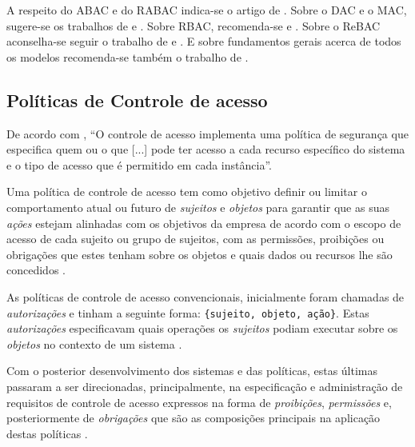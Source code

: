 A respeito do ABAC e do RABAC indica-se o artigo de . Sobre o DAC e o MAC, sugere-se os trabalhos de  e . Sobre RBAC, recomenda-se  e . Sobre o ReBAC aconselha-se seguir o trabalho de  e . E sobre fundamentos gerais acerca de todos os modelos recomenda-se também o trabalho de .

\subsection{Políticas de Controle de acesso}\label{controle_acesso}
De acordo com , ``O controle de acesso implementa uma política de segurança que especifica quem ou o que [...] pode ter acesso a cada recurso específico do sistema e o tipo de acesso que é permitido em cada instância''.

Uma política de controle de acesso tem como objetivo definir ou limitar o comportamento atual ou futuro de \textit{sujeitos} e \textit{objetos} para garantir que as suas \textit{ações} estejam alinhadas com os objetivos da empresa de acordo com o escopo de acesso de cada sujeito ou grupo de sujeitos, com as permissões, proibições ou obrigações que estes tenham sobre os objetos e quais dados ou recursos lhe são concedidos \cite{dunlop_dynamic_2002}.%

As políticas de controle de acesso convencionais, inicialmente foram chamadas de \textit{autorizações} e tinham a seguinte forma: \verb|{sujeito, objeto, ação}|. Estas \textit{autorizações} especificavam quais operações os \textit{sujeitos} podiam executar sobre os \textit{objetos} no contexto de um sistema \cite{di_vimercati_policies_2005}. %

Com o posterior desenvolvimento dos sistemas e das políticas, estas últimas passaram a ser direcionadas, principalmente, na especificação e administração de requisitos de controle de acesso expressos na forma de \textit{proibições}, \textit{permissões }e, posteriormente de \textit{obrigações} que são as composições principais na aplicação destas políticas \cite{sarkar_2017}.

